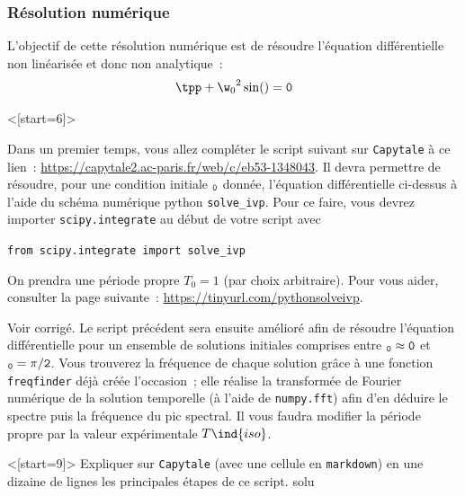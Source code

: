 \documentclass[../main/main.tex]{subfiles}
\begin{document}

\subsubsection{Résolution numérique}

L'objectif de cette résolution numérique est de résoudre l'équation
différentielle non linéarisée et donc non analytique~:
\[
	\tpp + {\w_0}^2 \sin(\tt) = 0
\]

\QR<[start=6]>{%
	Dans un premier temps, vous allez compléter le script suivant sur
	\texttt{Capytale} à ce lien~:
	\url{https://capytale2.ac-paris.fr/web/c/eb53-1348043}. Il devra
	permettre de résoudre, pour une condition initiale $\tt_0$ donnée,
	l'équation différentielle ci-dessus à l'aide du schéma numérique python
	\texttt{solve\_ivp}. Pour ce faire, vous devrez importer
	\texttt{scipy.integrate} au début de votre script avec
  \begin{center}
  \texttt{from scipy.integrate import solve\_ivp}
  \end{center}
	On prendra une période propre $T_0 = 1$ (par choix arbitraire).
	\bigbreak
	Pour vous aider, consulter la page suivante~:
	\url{https://tinyurl.com/pythonsolveivp}.
}{%
	Voir corrigé.
}
Le script précédent sera ensuite amélioré afin de résoudre l'équation
différentielle pour un ensemble de solutions initiales comprises entre
$\tt_0 \approx 0$ et $\tt_0 = \pi/2$. Vous trouverez la fréquence de
chaque solution grâce à une fonction \texttt{freqfinder} déjà créée
l'occasion~; elle réalise la transformée de Fourier numérique de
la solution temporelle (à l'aide de \texttt{numpy.fft}) afin d'en
déduire le spectre puis la fréquence du pic spectral. Il vous faudra
modifier la période propre par la valeur expérimentale $T\ind{iso}$.
\bigskip

\QR<[start=9]>{%
	Expliquer sur \texttt{Capytale} (avec une cellule en
	\texttt{markdown}) en une dizaine de lignes les principales étapes de ce
	script.
}{%
	solu
}




\end{document}
